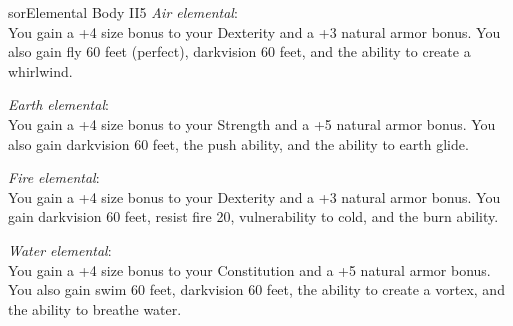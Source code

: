 \begin{spellcard}{sor}{Elemental Body II}{5}
  \vfill{}
  \emph{Air elemental}:\\
  You gain a +4 size bonus to your Dexterity and a +3 natural armor bonus.
  You also gain fly 60 feet (perfect), darkvision 60 feet, and the ability to create a whirlwind.

  \emph{Earth elemental}:\\
  You gain a +4 size bonus to your Strength and a +5 natural armor bonus.
  You also gain darkvision 60 feet, the push ability, and the ability to earth glide.

  \emph{Fire elemental}:\\
  You gain a +4 size bonus to your Dexterity and a +3 natural armor bonus.
  You gain darkvision 60 feet, resist fire 20, vulnerability to cold, and the burn ability.

  \emph{Water elemental}:\\
  You gain a +4 size bonus to your Constitution and a +5 natural armor bonus.
  You also gain swim 60 feet, darkvision 60 feet, the ability to create a vortex, and the ability to breathe water.
  \vfill{}

\end{spellcard}
